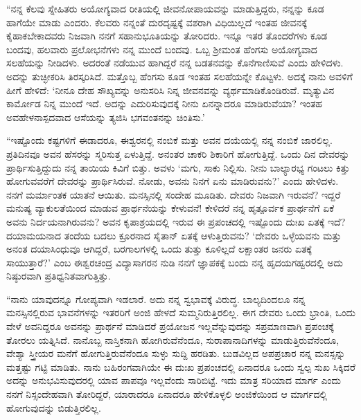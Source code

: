 “ನನ್ನ ಕೆಲವು ಸ್ನೇಹಿತರು ಅಯೋಗ್ಯವಾದ ರೀತಿಯಲ್ಲಿ ಜೀವನೋಪಾಯವನ್ನು ಮಾಡುತ್ತಿದ್ದರು, ನನ್ನನ್ನು ಕೂಡ ಹಾಗೆಯೇ ಮಾಡು ಎಂದರು. ಕೆಲವರು ನನ್ನಂತೆ ದುರದೃಷ್ಟಕ್ಕೆ ವಶರಾಗಿ ವಿಧಿಯಿಲ್ಲದೆ ಇಂತಹ ಜೀವನಕ್ಕೆ ಕೈಹಾಕಬೇಕಾದವರು ನಿಜವಾಗಿ ನನಗೆ ಸಹಾನುಭೂತಿಯನ್ನು ತೋರಿದರು. ಇನ್ನೂ ಇತರ ತೊಂದರೆಗಳು ಕೂಡ ಬಂದವು, ಹಲವಾರು ಪ್ರಲೋಭನೆಗಳು ನನ್ನ ಮುಂದೆ ಬಂದವು. ಒಬ್ಬ ಶ‍್ರೀಮಂತ ಹೆಂಗಸು ಅಯೋಗ್ಯವಾದ ಸಲಹೆಯನ್ನು ನೀಡಿದಳು. ಅದರಂತೆ ನಡೆಯುವ ಹಾಗಿದ್ದರೆ ನನ್ನ ಬಡತನವನ್ನು ಕೊನೆಗಾಣಿಸುವೆ ಎಂದು ಹೇಳಿದಳು. ಅದನ್ನು ತುಚ್ಛೀಕರಿಸಿ ತಿರಸ್ಕರಿಸಿದೆ. ಮತ್ತೊಬ್ಬ ಹೆಂಗಸು ಕೂಡ ಇಂತಹ ಸಲಹೆಯನ್ನೇ ಕೊಟ್ಟಳು. ಅದಕ್ಕೆ ನಾನು ಅವಳಿಗೆ ಹೀಗೆ ಹೇಳಿದೆ: ‘ನೀನೂ ದೇಹ ಸೌಖ್ಯವನ್ನು ಅನುಸರಿಸಿ ನಿನ್ನ ಜೀವನವನ್ನು ವ್ಯರ್ಥಮಾಡಿಕೊಂಡಿರುವೆ. ಮೃತ್ಯುವಿನ ಕಾರ್ಮೋಡ ನಿನ್ನ ಮುಂದೆ ಇದೆ. ಅದನ್ನು ಎದುರಿಸುವುದಕ್ಕೆ ನೀನು ಏನನ್ನಾದರೂ ಮಾಡಿರುವೆಯಾ? ಇಂತಹ ಅವಹೇಳನಾಸ್ಪದವಾದ ಆಸೆಯನ್ನು ತ್ಯಜಿಸಿ ಭಗವಂತನನ್ನು ಚಿಂತಿಸು.’

“ಇಷ್ಟೊಂದು ಕಷ್ಟಗಳಿಗೆ ಈಡಾದರೂ, ಈಶ್ವರನಲ್ಲಿ ನಂಬಿಕೆ ಮತ್ತು ಅವನ ದಯೆಯಲ್ಲಿ ನನ್ನ ನಂಬಿಕೆ ಜಾರಲಿಲ್ಲ. ಪ್ರತಿದಿನವೂ ಅವನ ಹೆಸರನ್ನು ಸ್ಮರಿಸುತ್ತ ಏಳುತ್ತಿದ್ದೆ. ಅನಂತರ ಚಾಕರಿ ಶಿಕಾರಿಗೆ ಹೋಗುತ್ತಿದ್ದೆ. ಒಂದು ದಿನ ದೇವರನ್ನು ಪ್ರಾರ್ಥಿಸುತ್ತಿದ್ದುದು ನನ್ನ ತಾಯಿಯ ಕಿವಿಗೆ ಬಿತ್ತು. ಅವಳು ‘ಮಗು, ಸಾಕು ನಿಲ್ಲಿಸು. ನೀನು ಬಾಲ್ಯಾರಭ್ಯ ಗಂಟಲು ಕಿತ್ತು ಹೋಗುವವರೆಗೆ ದೇವರನ್ನು ಪ್ರಾರ್ಥಿಸಿರುವೆ. ನೋಡು, ಅವನು ನಿನಗೆ ಏನು ಮಾಡಿರುವನು?’ ಎಂದು ಹೇಳಿದಳು. ನನಗೆ ಮರ್ಮಾಂತಕ ಯಾತನೆ ಆಯಿತು. ಮನಸ್ಸಿನಲ್ಲಿ ಸಂದೇಹ ಮೂಡಿತು. ದೇವರು ನಿಜವಾಗಿ ಇರುವನೆ? ಇದ್ದರೆ ಮನುಷ್ಯ ವ್ಯಾಕುಲತೆಯಿಂದ ಮಾಡುವ ಪ್ರಾರ್ಥನೆಯನ್ನು ಕೇಳುವನೆ! ಕೇಳಿದರೆ ನನ್ನ ಹೃತ್ಪೂರ್ವಕ ಪ್ರಾರ್ಥನೆಗೆ ಏಕೆ ಅವನು ನಿರ್ದಯನಾಗಿರುವನು? ಅವನ ಕೃಪಾಶ್ರಯದಲ್ಲಿ ಇರುವ ಈ ಪ್ರಪಂಚದಲ್ಲಿ ಇಷ್ಟೊಂದು ದುಃಖ ಏತಕ್ಕೆ ಇದೆ? ದಯಾಮಯನಾದ ತಂದೆಯ ಬದಲು ಕ್ರೂರನಾದ ಸೈತಾನ್ ಏತಕ್ಕೆ ಆಳುತ್ತಿರುವನು? ‘ದೇವರು ಒಳ್ಳೆಯವನು ಮತ್ತು ಅನಂತ ದಯಾಸಿಂಧುವೂ ಆಗಿದ್ದರೆ, ಬರಗಾಲಗಳಲ್ಲಿ ಒಂದು ತುತ್ತು ಕೂಳಿಲ್ಲದೆ ಲಕ್ಷಾಂತರ ಜನರು ಏತಕ್ಕೆ ಸಾಯುತ್ತಾರೆ?’ ಎಂಬ ಈಶ್ವರಚಂದ್ರ ವಿದ್ಯಾಸಾಗರನ ನುಡಿ ನನಗೆ ಜ್ಞಾಪಕಕ್ಕೆ ಬಂದು ನನ್ನ ಹೃದಯಗಹ್ವರದಲ್ಲಿ ಅದು ನಿಷ್ಠುರವಾಗಿ ಪ್ರತಿಧ್ವನಿತವಾಗುತ್ತಿತ್ತು.

\newpage

“ನಾನು ಯಾವುದನ್ನೂ ಗೋಪ್ಯವಾಗಿ ಇಡಲಾರೆ. ಅದು ನನ್ನ ಸ್ವಭಾವಕ್ಕೆ ವಿರುದ್ಧ. ಬಾಲ್ಯದಿಂದಲೂ ನನ್ನ ಮನಸ್ಸಿನಲ್ಲಿರುವ ಭಾವನೆಗಳನ್ನು ಇತರರಿಗೆ ಅಂಜಿ ಹೇಳದೆ ಸುಮ್ಮನಿರುತ್ತಿರಲಿಲ್ಲ. ಈಗ ದೇವರು ಒಂದು ಭ್ರಾಂತಿ, ಒಂದು ವೇಳೆ ಅವನಿದ್ದರೂ ಅವನನ್ನು ಪ್ರಾರ್ಥನೆ ಮಾಡಿದರೆ ಪ್ರಯೋಜನ ಇಲ್ಲವೆನ್ನುವುದನ್ನು ಸಪ್ರಮಾಣವಾಗಿ ಪ್ರಪಂಚಕ್ಕೆ ತೋರಲು ಯತ್ನಿಸಿದೆ. ನಾನೊಬ್ಬ ನಾಸ್ತಿಕನಾಗಿ ಹೋಗಿರುವೆನೆಂದೂ, ಸುರಾಪಾನಾದಿಗಳನ್ನು ಮಾಡುತ್ತಿರುವೆನೆಂದೂ, ವೇಶ್ಯಾ ಸ್ತ್ರೀಯರ ಮನೆಗೆ ಹೋಗುತ್ತಿರುವೆನೆಂದೂ ಸುಳ್ಳು ಸುದ್ದಿ ಹರಡಿತು. ಬುಡವಿಲ್ಲದ ಅಪಪ್ರಚಾರ ನನ್ನ ಮನಸ್ಸನ್ನು ಮತ್ತಷ್ಟು ಗಟ್ಟಿ ಮಾಡಿತು. ನಾನು ಬಹಿರಂಗವಾಗಿಯೇ ಈ ದುಃಖ ಪ್ರಪಂಚದಲ್ಲಿ ಏನಾದರೂ ಒಂದು ಸ್ವಲ್ಪ ಸುಖ ಸಿಕ್ಕಿದರೆ ಅದನ್ನು ಅನುಭವಿಸುವುದರಲ್ಲಿ ಯಾವ ಪಾಪವೂ ಇಲ್ಲವೆಂದು ಸಾರಿಬಿಟ್ಟೆ. ಇದು ಮಾತ್ರ ಸರಿಯಾದ ಮಾರ್ಗ ಎಂದು ನನಗೆ ನಿಸ್ಸಂದೇಹವಾಗಿ ತೋರಿದ್ದರೆ, ಯಾರಾದರೂ ಏನಾದರೂ ಹೇಳಿಕೊಳ್ಳಲಿ ಅಂಜಿಕೆಯಿಂದ ಆ ಮಾರ್ಗದಲ್ಲಿ ಹೋಗುವುದನ್ನು ಬಿಡುತ್ತಿರಲಿಲ್ಲ.

